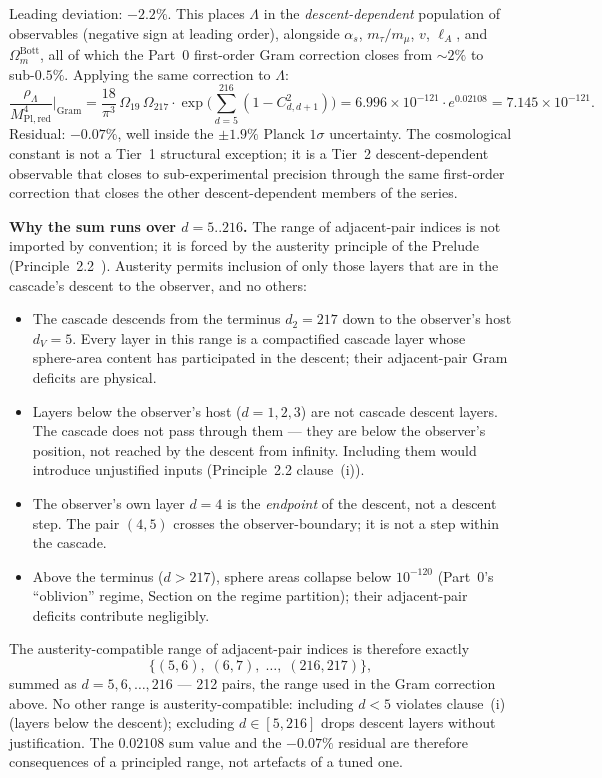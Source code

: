 \documentclass[11pt,a4paper]{article}
\begin{document}
Leading deviation: $-2.2\%$. This places $\Lambda$ in the
\emph{descent-dependent} population of observables (negative sign at
leading order), alongside $\alpha_s$, $m_\tau/m_\mu$, $v$, $\ell_A$,
and $\Omega_m^{\mathrm{Bott}}$, all of which the Part~0
first-order Gram correction closes from $\sim\!2\%$ to sub-$0.5\%$.
Applying the same correction to $\Lambda$:
\[
\frac{\rho_\Lambda}{M^4_{\mathrm{Pl,red}}}\bigg|_{\mathrm{Gram}}
= \frac{18}{\pi^3}\,\Omega_{19}\,\Omega_{217}\cdot\exp\!\bigl(\textstyle\sum_{d=5}^{216}(1-C^2_{d,d+1})\bigr)
= 6.996\times 10^{-121}\cdot e^{0.02108}
= 7.145\times 10^{-121}.
\]
Residual: $-0.07\%$, well inside the $\pm 1.9\%$ Planck $1\sigma$
uncertainty. The cosmological constant is not a Tier~1 structural
exception; it is a Tier~2 descent-dependent observable that closes to
sub-experimental precision through the same first-order correction
that closes the other descent-dependent members of the series.

\noindent\textbf{Why the sum runs over $d=5..216$.} The range of
adjacent-pair indices is not imported by convention; it is forced by
the austerity principle of the Prelude
(Principle~2.2~\cite{prelude}). Austerity permits inclusion of only
those layers that are in the cascade's descent to the observer, and no
others:
\begin{itemize}[nosep]
\item The cascade descends from the terminus $d_2 = 217$ down to the
observer's host $d_V = 5$. Every layer in this range is a compactified
cascade layer whose sphere-area content has participated in the
descent; their adjacent-pair Gram deficits are physical.
\item Layers below the observer's host ($d = 1, 2, 3$) are not cascade
descent layers. The cascade does not pass through them --- they are
below the observer's position, not reached by the descent from
infinity. Including them would introduce unjustified inputs
(Principle~2.2 clause~(i)).
\item The observer's own layer $d=4$ is the \emph{endpoint} of the
descent, not a descent step. The pair $(4,5)$ crosses the
observer-boundary; it is not a step within the cascade.
\item Above the terminus ($d > 217$), sphere areas collapse below
$10^{-120}$ (Part~0's ``oblivion'' regime, Section on the regime
partition); their adjacent-pair deficits contribute negligibly.
\end{itemize}
The austerity-compatible range of adjacent-pair indices is
therefore exactly
\[
\{(5,6),\; (6,7),\; \ldots,\; (216,217)\},
\]
summed as $d = 5, 6, \ldots, 216$ --- 212 pairs, the range used in
the Gram correction above. No other range is austerity-compatible: including
$d < 5$ violates clause~(i) (layers below the descent); excluding
$d \in [5, 216]$ drops descent layers without justification. The
$0.02108$ sum value and the $-0.07\%$ residual are therefore
consequences of a principled range, not artefacts of a tuned one.
\end{document}
